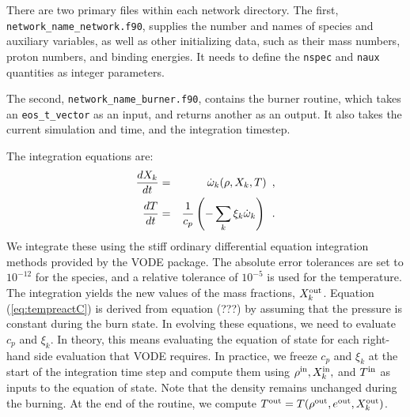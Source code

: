 \documentclass[11pt]{book}
\def\omegadot {\dot\omega}
\def\inp  {{\rm in}}
\def\outp {{\rm out}}
\begin{document}
There are two primary files within each network directory. The first,
{\tt network\_name\_network.f90}, supplies the number and names of species and
auxiliary variables, as well as other initializing data, 
such as their mass numbers, proton numbers, and binding energies. It needs to 
define the {\tt nspec} and {\tt naux} quantities as integer parameters.

The second, {\tt network\_name\_burner.f90}, contains the burner routine, which takes
an {\tt eos\_t\_vector} as an input, and returns another as an output. It also takes 
the current simulation and time, and the integration timestep.

The integration equations are:
\begin{eqnarray}
\frac{dX_k}{dt} &=& \omegadot_k(\rho,X_k,T)\enskip, \label{eq:VODE1C} \\
\frac{dT}{dt} &=&\frac{1}{c_p} \left ( -\sum_k \xi_k  \omegadot_k  \right )\enskip. \label{eq:tempreactC}
\end{eqnarray}
We integrate these using the stiff ordinary differential equation integration methods
provided by the VODE package.  The absolute error tolerances are set
to $10^{-12}$ for the species, and a relative tolerance of $10^{-5}$
is used for the temperature.  The integration yields the new values of
the mass fractions, $X_k^\outp$.  Equation (\ref{eq:tempreactC}) is
derived from equation (???) by assuming that the pressure is constant
during the burn state.  In evolving these equations, we need to
evaluate $c_p$ and $\xi_k$.  In theory, this means evaluating the
equation of state for each right-hand side evaluation that VODE
requires.  In practice, we freeze $c_p$ and $\xi_k$ at the start of
the integration time step and compute them using $\rho^\inp,
X_k^\inp,$ and $T^\inp$ as inputs to the equation of state.  Note that
the density remains unchanged during the burning.  At the end of the
routine, we compute $T^\outp = T(\rho^\outp,e^{\outp},X_k^\outp)$.

\backmatter

\renewcommand\bibname{References}


\end{document}
